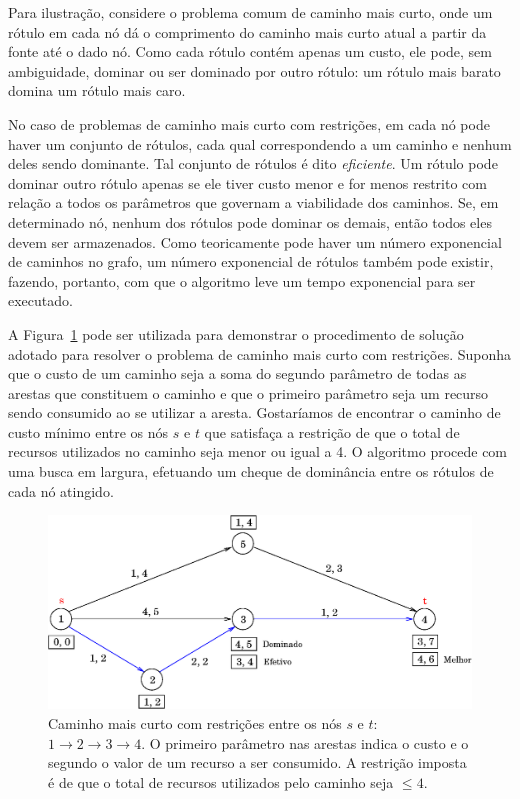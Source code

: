 Para ilustração, considere o problema comum de caminho mais curto, onde um rótulo em cada nó dá o 
comprimento do caminho mais curto atual a partir da fonte até o dado nó. Como cada rótulo contém
apenas um custo, ele pode, sem ambiguidade, dominar ou ser dominado por outro rótulo: um rótulo mais
barato domina um rótulo mais caro.

No caso de problemas de caminho mais curto com restrições, em cada nó pode haver um conjunto de 
rótulos, cada qual correspondendo a um caminho e nenhum deles sendo dominante. Tal conjunto de 
rótulos é dito {\it eficiente}. Um rótulo pode dominar outro rótulo apenas se ele tiver custo
menor e for menos restrito com relação a todos os parâmetros que governam a viabilidade dos 
caminhos. Se, em determinado nó, nenhum dos rótulos pode dominar os demais, então todos eles
devem ser armazenados. Como teoricamente pode haver um número exponencial de caminhos no grafo, um
número exponencial de rótulos também pode existir, fazendo, portanto, com que o algoritmo leve um
tempo exponencial para ser executado.

A Figura~\ref{fig:shortest_path} pode ser utilizada para demonstrar o procedimento de solução
adotado para resolver o problema de caminho mais curto com restrições. Suponha que o custo de um
caminho seja a soma do segundo parâmetro de todas as arestas que constituem o caminho e que o
primeiro parâmetro seja um recurso sendo consumido ao se utilizar a aresta. Gostaríamos de encontrar
o caminho de custo mínimo entre os nós $s$ e $t$ que satisfaça a restrição de que o total de
recursos utilizados no caminho seja menor ou igual a 4. O algoritmo procede com uma busca em 
largura, efetuando um cheque de dominância entre os rótulos de cada nó atingido.

\begin{figure}[htbp]
	\begin{center}
		\includegraphics[scale=0.6]{fig/shortest_path.eps}
		\caption{Caminho mais curto com restrições entre os nós $s$ e $t$: $1 \to 2 \to 3 \to 4$.
		O primeiro parâmetro nas arestas indica o custo e o segundo o valor de um recurso a ser
    consumido. A restrição imposta é de que o total de recursos utilizados pelo caminho seja 
		$\leq 4$.}
		\label{fig:shortest_path}
	\end{center}
\end{figure}